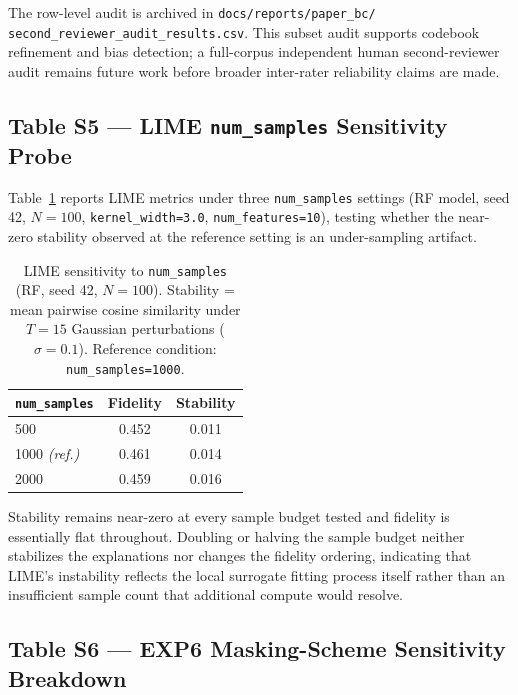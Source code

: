 \documentclass[10pt]{article}
\begin{document}
\noindent The row-level audit is archived in
\texttt{docs/reports/paper\_bc/}\\
\texttt{second\_reviewer\_audit\_results.csv}. This subset audit supports
codebook refinement and bias detection; a full-corpus independent human
second-reviewer audit remains future work before broader inter-rater
reliability claims are made.

\subsection*{Table S5 — LIME \texttt{num\_samples} Sensitivity Probe}
\label{sec:supp_ns}

Table~\ref{tab:s5_ns} reports LIME metrics under three
\texttt{num\_samples} settings (RF model, seed 42, $N=100$,
\texttt{kernel\_width=3.0}, \texttt{num\_features=10}), testing whether
the near-zero stability observed at the reference setting is an
under-sampling artifact.

\begin{table}[h]
\centering
\caption{LIME sensitivity to \texttt{num\_samples} (RF, seed 42, $N=100$).
Stability = mean pairwise cosine similarity under $T=15$ Gaussian
perturbations ($\sigma=0.1$). Reference condition:
\texttt{num\_samples=1000}.}
\label{tab:s5_ns}
\begin{tabular}{lcc}
\toprule
\texttt{num\_samples} & Fidelity & Stability \\
\midrule
500                     & 0.452 & 0.011 \\
1000 \emph{(ref.)}      & 0.461 & 0.014 \\
2000                    & 0.459 & 0.016 \\
\bottomrule
\end{tabular}
\end{table}

\noindent Stability remains near-zero at every sample budget tested and
fidelity is essentially flat throughout. Doubling or halving the sample
budget neither stabilizes the explanations nor changes the fidelity
ordering, indicating that LIME's instability reflects the local surrogate
fitting process itself rather than an insufficient sample count that
additional compute would resolve.

\subsection*{Table S6 — EXP6 Masking-Scheme Sensitivity Breakdown}
\label{sec:supp_exp6}
\end{document}
